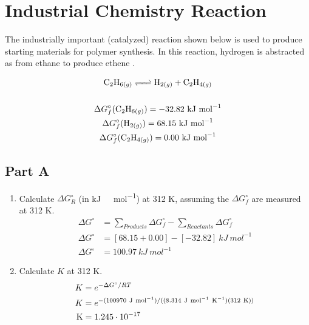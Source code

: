 \documentclass{article}
\begin{document}
\section{Industrial Chemistry Reaction}

The industrially important (catalyzed) reaction shown below is used to produce
starting materials for polymer synthesis. In this reaction, hydrogen is
abstracted as  from ethane  to produce ethene
.

\begin{gather*}
    \ce{C_{2}H_{6(g)} <=> H_{2(g)} + C_{2}H_{4(g)}}\\\\
    \Delta G^{\circ}_{f}(\ce{C_{2}H_{6(g)}}) = -32.82\ \si{kJ\ mol^{-1}}\\
    \Delta G^{\circ}_{f}(\ce{H_{2(g)}}) = 68.15\ \si{kJ\ mol^{-1}}\\
    \Delta G^{\circ}_{f}(\ce{C_{2}H_{4(g)}}) = 0.00\ \si{kJ\ mol^{-1}}
\end{gather*}

\subsection*{Part A}

\begin{enumerate}
    \item Calculate $\Delta G^{\circ}_{R}$ (in \si{kJ\ mol^{-1}}) at 312 \si{K},
        assuming the $\Delta G^{\circ}_{f}$ are measured at 312 \si{K}.
    \begin{align*}
        \Delta G^{\circ}&=\sum\limits_{Products}\Delta G^{\circ}_{f} -
        \sum\limits_{Reactants} \Delta G^{\circ}_{f}\\
        \Delta G^{\circ}&=\left[68.15+0.00\right]-\left[-32.82\right]\ \si{kJ\
    mol^{-1}}\\
        \Delta G^{\circ}&=100.97\ \si{kJ\ mol^{-1}}
    \end{align*}
    \item Calculate $K$ at 312 \si{K}.
    \begin{align*}
        K &= e^{-\Delta G^{\circ}/RT}\\
        K &= e^{-(100970\ \si{J\ mol^{-1}})/((8.314\ \si{J\ mol^{-1}\
K^{-1}})(312\ \si{K}))}\\
        \ce{K} &= 1.245\cdot 10^{-17}
    \end{align*}
    
\end{enumerate}
\end{document}
